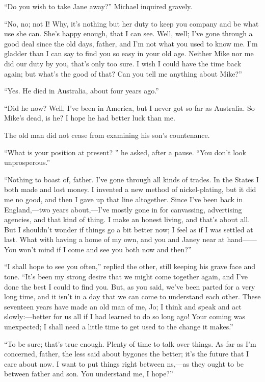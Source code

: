 ``Do you wish to take Jane away?'' Michael inquired gravely.

``No, no; not I! Why, it's nothing but her duty to keep you company and
be what use she can. She's happy enough, that I can see. Well, well;
I've gone through a good deal since the old days, father, and I'm not
what you used to know me. I'm gladder {\protect\hypertarget{83}{}{}}than
I can say to find you so easy in your old age. Neither Mike nor me did
our duty by you, that's only too sure. I wish I could have the time back
again; but what's the good of that? Can you tell me anything about
Mike?''

``Yes. He died in Australia, about four years ago.''

``Did he now? Well, I've been in America, but I never got so far as
Australia. So Mike's dead, is he? I hope he had better luck than me.

The old man did not cease from examining his son's countenance.

``What is your position at present? '' he asked, after a pause. ``You
don't look unprosperous.''

``Nothing to boast of, father. I've gone through all kinds of trades. In
the States I both made and lost money. I invented a new method of
nickel-plating, but it did me no good, and then I gave up that line
altogether. Since I've been back in England,---two years about,---I've
mostly gone in for canvassing, {\protect\hypertarget{84}{}{}}advertising
agencies, and that kind of thing. I make an honest living, and that's
about all. But I shouldn't wonder if things go a bit better now; I feel
as if I was settled at last. What with having a home of my own, and you
and Janey near at hand{{------}} You won't mind if I come and see you
both now and then?''

``I shall hope to see you often,'' replied the other, still keeping his
grave face and tone. ``It's been my strong desire that we might come
together again, and I've done the best I could to find you. But, as you
said, we've been parted for a very long time, and it isn't in a day that
we can come to understand each other. These seventeen years have made an
old man of me, Jo; I think and speak and act slowly:---better for us all
if I had learned to do so long ago! Your coming was unexpected; I shall
need a little time to get used to the change it makes.''

``To be sure; that's true enough. Plenty of time to talk over things. As
far as I'm concerned, father, the less said about bygones
{\protect\hypertarget{85}{}{}}the better; it's the future that I care
about now. I want to put things right between ns,---as they ought to be
between father and son. You understand me, I hope?''

